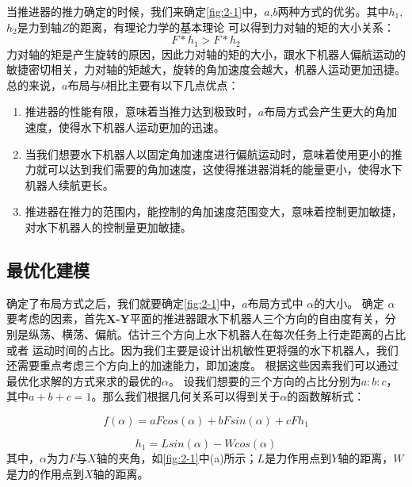 当推进器的推力确定的时候，我们来确定\autoref{fig:2-1}中，$a$,$b$两种方式的优劣。其中$h_1$,$h_2$是力到轴$Z$的距离，有理论力学的基本理论
可以得到力对轴的矩的大小关系：
\begin{equation}
    \label{equ:2-1}
    F*h_1 > F*h_2
\end{equation}
力对轴的矩是产生旋转的原因，因此力对轴的矩的大小，跟水下机器人偏航运动的敏捷密切相关，力对轴的矩越大，旋转的角加速度会越大，机器人运动更加迅捷。
总的来说，$a$布局与$b$相比主要有以下几点优点：
\begin{enumerate}
    \item  推进器的性能有限，意味着当推力达到极致时，$a$布局方式会产生更大的角加速度，使得水下机器人运动更加的迅速。
    \item  当我们想要水下机器人以固定角加速度进行偏航运动时，意味着使用更小的推力就可以达到我们需要的角加速度，这使得推进器消耗的能量更小，使得水下机器人续航更长。
    \item  推进器在推力的范围内，能控制的角加速度范围变大，意味着控制更加敏捷，对水下机器人的控制量更加敏捷。
\end{enumerate}
\subsection{最优化建模}
确定了布局方式之后，我们就要确定\autoref{fig:2-1}中，$a$布局方式中 $\alpha $的大小。
确定 $\alpha $要考虑的因素，首先{\bf{X-Y}}平面的推进器跟水下机器人三个方向的自由度有关，分别是纵荡、横荡、偏航。估计三个方向上水下机器人在每次任务上行走距离的占比或者
运动时间的占比。因为我们主要是设计出机敏性更将强的水下机器人，我们还需要重点考虑三个方向上的加速能力，即加速度。
根据这些因素我们可以通过最优化求解的方式来求的最优的$\alpha $。
设我们想要的三个方向的占比分别为$a:b:c$，其中$  a+b+c = 1$。那么我们根据几何关系可以得到关于$\alpha $的函数解析式：

\begin{equation}
    \label{equ:2-2}
    f(\alpha) = aFcos(\alpha)+bFsin(\alpha)+cFh_1
\end{equation}


\begin{equation}
    \label{equ:2-3}
    h_1 = Lsin(\alpha)-Wcos(\alpha)
\end{equation}
其中，$\alpha$为力$F$与$X$轴的夹角，如\autoref{fig:2-1}中(a)所示；$L$是力作用点到$Y$轴的距离，$W$是力的作用点到$X$轴的距离。

